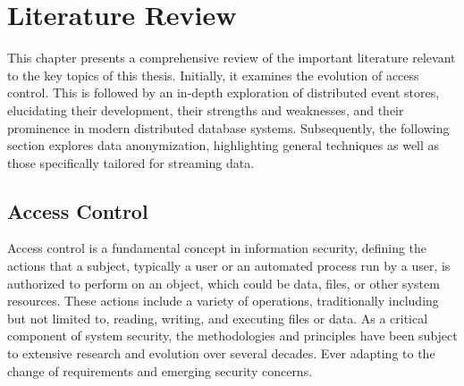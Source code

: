\chapter{Literature Review\label{cha:chapter2}}
This chapter presents a comprehensive review of the important literature relevant to the key topics of this thesis. Initially, it examines the evolution of access control. This is followed by an in-depth exploration of distributed event stores, elucidating their development, their strengths and weaknesses, and their prominence in modern distributed database systems. Subsequently, the following section explores data anonymization, highlighting general techniques as well as those specifically tailored for streaming data.


\section{Access Control\label{sec:rbac}}
Access control is a fundamental concept in information security, defining the actions that a subject, typically a user or an automated process run by a user, is authorized to perform on an object, which could be data, files, or other system resources. These actions include a variety of operations, traditionally including but not limited to, reading, writing, and executing files or data. As a critical component of system security, the methodologies and principles have been subject to extensive research and evolution over several decades. Ever adapting to the change of requirements and emerging security concerns.\par
